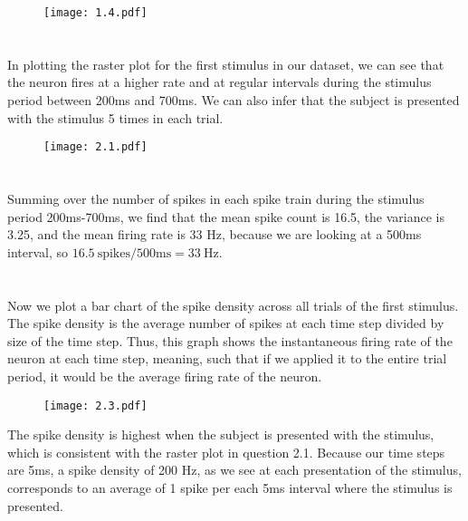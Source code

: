 \documentclass{article}
\begin{document}
\begin{figure}[ht]
    \centering
    \texttt{[image: 1.4.pdf]}
\end{figure}

\setcounter{section}{0}
\renewcommand{\thesection}{2.\arabic{section}}

\section{}
In plotting the raster plot for the first stimulus in our dataset, we can see that the neuron fires at a higher rate and at regular intervals during the stimulus period between 200ms and 700ms. We can also infer that the subject is presented with the stimulus 5 times in each trial. 

\begin{figure}[ht]
    \centering
    \texttt{[image: 2.1.pdf]}
    \vspace{-15pt}
\end{figure}


\section{}
Summing over the number of spikes in each spike train during the stimulus period 200ms-700ms, we find that the mean spike count is 16.5, the variance is 3.25, and the mean firing rate is 33 Hz, because we are looking at a 500ms interval, so $16.5 \ \text{spikes} / 500\text{ms} = 33 \ \text{Hz}$.
\vspace{4pt}

\section{}
Now we plot a bar chart of the spike density across all trials of the first stimulus. The spike density is the average number of spikes at each time step divided by size of the time step. Thus, this graph shows the instantaneous firing rate of the neuron at each time step, meaning, such that if we applied it to the entire trial period, it would be the average firing rate of the neuron.

\begin{figure}[ht]
    \centering
    \texttt{[image: 2.3.pdf]}
    \vspace{-8pt}

\end{figure}

The spike density is highest when the subject is presented with the stimulus, which is consistent with the raster plot in question 2.1. Because our time steps are 5ms, a spike density of 200 Hz, as we see at each presentation of the stimulus, corresponds to an average of 1 spike per each 5ms interval where the stimulus is presented.
\vspace{8px}
\end{document}
